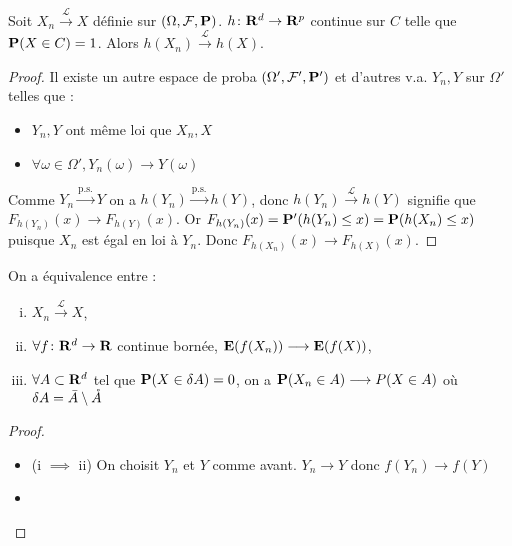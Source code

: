 	\begin{thm}[de continuité]
		Soit $X_n \overset{\mathcal{L}}{\longrightarrow} X$ définie sur $(\Omega,\mathcal{F},\mathbf{P})$.
		$h \colon \mathbf{R}^d \to \mathbf{R}^p$ continue sur $C$ telle que $\mathbf{P}(X \in C) = 1$.
		Alors  $h(X_n) \overset{\mathcal{L}}{\longrightarrow} h(X)$.
	\end{thm}

	\begin{proof}
		Il existe un autre espace de proba $(\Omega', \mathcal{F}', \mathbf{P}')$ et d'autres v.a. $Y_n, Y$ sur $\Omega'$ telles que :
		\begin{itemize}
			\item[\textbullet] $Y_n, Y$ ont même loi que $X_n, X$
			\item[\textbullet] $\forall \omega \in \Omega', Y_n(\omega) \longrightarrow Y(\omega)$
		\end{itemize}
		Comme $Y_n \overset{\text{p.s.}}{\longrightarrow} Y$ on a $h(Y_n) \overset{\text{p.s.}}{\longrightarrow} h(Y)$, donc $h(Y_n) \overset{\mathcal{L}}{\longrightarrow} h(Y)$ signifie que $F_{h(Y_n)}(x) \longrightarrow F_{h(Y)}(x)$.
		Or $F_{h(Y_n)}(x) = \mathbf{P}'(h(Y_n) \leq x) = \mathbf{P}(h(X_n) \leq x)$ puisque $X_n$ est égal en loi à $Y_n$.
		Donc $F_{h(X_n)}(x) \longrightarrow F_{h(X)}(x)$.
	\end{proof}
	
	\begin{thm}[de Portmanteau]
		On a équivalence entre :
		\begin{enumerate}[(i)]
			\item $X_n \overset{\mathcal{L}}{\longrightarrow} X$,
			\item $\forall f \colon \mathbf{R}^d \to \mathbf{R}$ continue bornée, $\mathbf{E}(f(X_n)) \longrightarrow \mathbf{E}(f(X))$,
			\item $\forall A \subset \mathbf{R}^d$ tel que $\mathbf{P}(X \in \delta A) = 0$, on a $\mathbf{P}(X_n \in A) \longrightarrow P(X \in A)$ où $\delta A = \Bar{A} \setminus \mathring{A}$
		\end{enumerate}
	\end{thm}

	\begin{proof}
		\begin{itemize}
			\item[\textbullet] (i $\implies$ ii)
				On choisit $Y_n$ et $Y$ comme avant.
				$Y_n \longrightarrow Y$ donc $f(Y_n) \longrightarrow f(Y)$ 
			\item[\textbullet] 
		\end{itemize}
	\end{proof}

